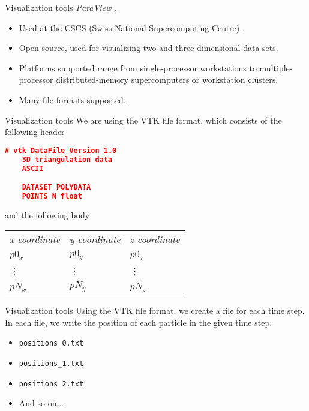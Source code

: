 \documentclass[aspectratio=169]{beamer}
\begin{document}
\begin{frame}[fragile]{Visualization tools}
	\emph{ParaView} \cite{website:paraview_wiki}.
	\begin{itemize}
		\item Used at the CSCS (Swiss National Supercomputing Centre) \cite{website:cscs}.
		\item Open source, used for visualizing two and three-dimensional data sets.
		\item Platforms supported range from single-processor workstations to multiple-processor distributed-memory supercomputers or workstation clusters.
		\item Many file formats supported.
	\end{itemize}
\end{frame}

\begin{frame}[fragile]{Visualization tools}
	We are using the VTK file format, which consists of the following header
	\begin{lstlisting}[language=json]
	# vtk DataFile Version 1.0
	3D triangulation data
	ASCII

	DATASET POLYDATA
	POINTS N float
	\end{lstlisting}
	and the following body
	\begin{table}
		\centering
		\begin{tabular}{l l l}
			\emph{x-coordinate} & \emph{y-coordinate} & \emph{z-coordinate} \\
			$p0_x$ & $p0_y$ & $p0_z$\\
			\vdots & \vdots & \vdots\\
			$pN_x$ & $pN_y$ & $pN_z$\\
		\end{tabular}
	\end{table}
\end{frame}

\begin{frame}[fragile]{Visualization tools}
	Using the VTK file format, we create a file for each time step. In each file, we write the position of each particle in the given time step.
	\begin{itemize}
		\item \texttt{positions\_0.txt}
		\item \texttt{positions\_1.txt}
		\item \texttt{positions\_2.txt}
		\item And so on...
	\end{itemize}
\end{frame}
\end{document}

